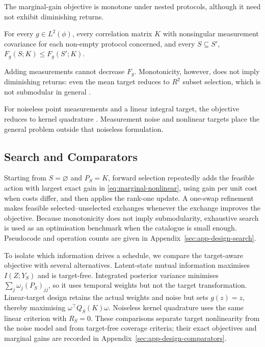 The marginal-gain objective is monotone under nested protocols, although it
need not exhibit diminishing returns.
\begin{lemma}
\label{prop:monotone}
For every $g\in L^2(\phi)$, every correlation matrix $K$ with nonsingular
measurement covariance for each non-empty protocol concerned, and every
$S\subseteq S'$,
$F_g(S;K)\le F_g(S';K)$.
\end{lemma}

Adding measurements cannot decrease $F_g$. Monotonicity, however, does not
imply diminishing returns: even the mean target reduces to $R^2$ subset
selection, which is not submodular in general \citep{das2018submodular}.

For noiseless point measurements and a linear integral target, the objective
reduces to kernel quadrature
\citep{bach2017equivalence,briol2019probabilistic}. Measurement noise and
nonlinear targets place the general problem outside that noiseless formulation.

\subsection{Search and Comparators}
\label{sec:algorithms}

Starting from $S=\varnothing$ and $P_S=K$, forward selection repeatedly adds
the feasible action with largest exact gain in
\eqref{eq:marginal-nonlinear}, using gain per unit cost when costs differ, and
then applies the rank-one update. A one-swap refinement makes feasible
selected--unselected exchanges whenever the exchange improves the objective.
Because monotonicity does not imply submodularity, exhaustive search is used as an
optimisation benchmark when the catalogue is small enough. Pseudocode and
operation counts are given in Appendix~\ref{sec:app-design-search}.

To isolate which information drives a schedule, we compare the target-aware
objective with several alternatives. Latent-state
mutual information maximises $I(Z;Y_S)$ and is target-free. Integrated
posterior variance minimises $\sum_j\omega_j(P_S)_{jj}$, so it uses temporal
weights but not the target transformation. Linear-target design retains the
actual weights and noise but sets $g(z)=z$, thereby maximising
$\omega^\top Q_S(K)\omega$. Noiseless kernel quadrature uses the same linear
criterion with $R_S=0$. These comparisons separate target nonlinearity from
the noise model and from target-free coverage criteria; their exact objectives
and marginal gains are recorded in Appendix~\ref{sec:app-design-comparators}.
